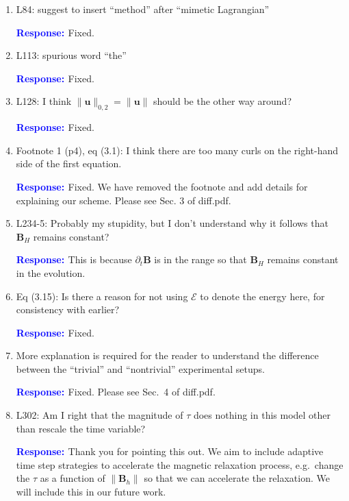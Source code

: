 \documentclass{article}
\theoremstyle{definition}
\newcommand{\rv}[1]{%
  \colorbox{gray!20}{%
    \parbox{0.96\linewidth}{%
      \small #1
    }%
  }%
}
\newcommand{\rp}{\textbf{\textcolor{blue}{Response: }}}
\newcommand{\blue}[1]{\textcolor{blue}{#1}}
\begin{document}
\begin{enumerate}
\rp Fixed. We add the force-free equilibrium for the description of the Parker conjecture: \blue{\emph{For almost all possible boundary flows the magnetic field develops tangential discontinuities during relaxation to a force-free equilibrium.}}

\item \rv{L84: suggest to insert “method” after “mimetic Lagrangian”}

\rp Fixed. 

\item \rv{L113: spurious word “the”}

\rp Fixed.

\item \rv{L128: I think $\|\bm u\|_{0, 2} = \|\bm u\|$ should be the other way around?}

\rp Fixed.

\item \rv{Footnote 1 (p4), eq (3.1): I think there are too many curls on the right-hand side of the
first equation.}

\rp Fixed.
We have removed the footnote and add details for explaining our scheme. Please see Sec. 3 of diff.pdf. 

\item \rv{L234-5: Probably my stupidity, but I don’t understand why it follows that $\bm B_H$ remains
constant?}

\rp This is because $\partial_t \bm B$ is in the range so that $\bm B_H$ remains constant in the evolution.

\item \rv{Eq (3.15): Is there a reason for not using $\mathcal{E}$ to denote the energy here, for consistency with
earlier?}

\rp Fixed. 

\item \rv{More explanation is required for the reader to understand the diﬀerence between
the “trivial” and “nontrivial” experimental setups.}

\rp Fixed.
Please see Sec.~4 of diff.pdf. 

\item \rv{L302: Am I right that the magnitude of $\tau$ does nothing in this model other than rescale
the time variable?}

\rp Thank you for pointing this out. We aim to include adaptive time step strategies to accelerate the magnetic relaxation process, e.g.~change the $\tau$ as a function of $\|\bm B_h\|$ so that we can accelerate the relaxation. We will include this in our future work. 


\end{enumerate}
\end{document}
